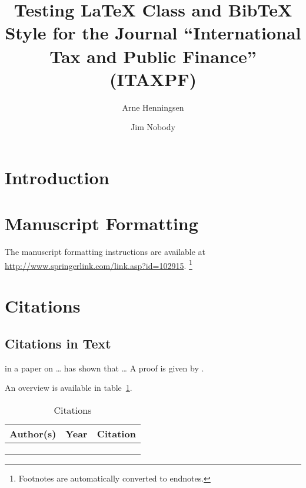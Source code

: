 \documentclass{itaxpf}
\title{Testing \LaTeX{} Class and Bib\TeX{} Style for the
   Journal ``International Tax and Public Finance'' (ITAXPF)}
\author{Arne Henningsen \and Jim Nobody}
\affiliation{University~of~Kiel}
\begin{document}
\maketitle

\begin{abstract}
\end{abstract}


\section{Introduction}



\section{Manuscript Formatting}

The manuscript formatting instructions are available at
\url{http://www.springerlink.com/link.asp?id=102915}.%
\footnote{
Footnotes are automatically converted to endnotes.
}


\section{Citations}

\subsection{Citations in Text}

\citeauthor{becker64} in a paper on \ldots
\citet[p.~12]{schoemaker80} has shown that \ldots
A proof is given by \citet{smith86}.

An overview is available in table~\ref{tab:citations}.

\begin{table}[htbp]
\centering
\caption{Citations}
\label{tab:citations}
\begin{tabular}{lll}
\hline
Author(s) & Year & Citation\\
\hline
\citeauthor{becker64} & \citeyear{becker64} & \citet{becker64}\\
\citeauthor{schoemaker80} & \citeyear{schoemaker80} & \citet{schoemaker80}\\
\citeauthor{smith86} & \citeyear{smith86} & \citet{smith86}\\
\hline
\end{tabular}
\end{table}
\end{document}
